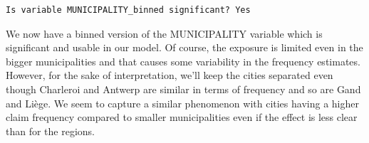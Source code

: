 \documentclass[
  english,
  11pt,
]{article}
\newenvironment{Shaded}{\begin{snugshade}}{\end{snugshade}}
\newcommand{\AttributeTok}[1]{\textcolor[rgb]{0.13,0.29,0.53}{#1}}
\newcommand{\DecValTok}[1]{\textcolor[rgb]{0.00,0.00,0.81}{#1}}
\newcommand{\FunctionTok}[1]{\textcolor[rgb]{0.13,0.29,0.53}{\textbf{#1}}}
\newcommand{\NormalTok}[1]{#1}
\newcommand{\OtherTok}[1]{\textcolor[rgb]{0.56,0.35,0.01}{#1}}
\newcommand{\SpecialCharTok}[1]{\textcolor[rgb]{0.81,0.36,0.00}{\textbf{#1}}}
\newcommand{\StringTok}[1]{\textcolor[rgb]{0.31,0.60,0.02}{#1}}
\begin{document}
\begin{Shaded}
\end{Shaded}

\begin{verbatim}
Is variable MUNICIPALITY_binned significant? Yes
\end{verbatim}

We now have a binned version of the MUNICIPALITY variable which is
significant and usable in our model. Of course, the exposure is limited
even in the bigger municipalities and that causes some variability in
the frequency estimates. However, for the sake of interpretation, we'll
keep the cities separated even though Charleroi and Antwerp are similar
in terms of frequency and so are Gand and Liège. We seem to capture a
similar phenomenon with cities having a higher claim frequency compared
to smaller municipalities even if the effect is less clear than for the
regions.
\end{document}
